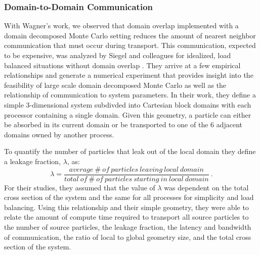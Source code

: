 \subsubsection{Domain-to-Domain Communication}
\label{subsubsec:mc_comm_costs}
With Wagner's work, we observed that domain overlap implemented with a
domain decomposed Monte Carlo setting reduces the amount of nearest
neighbor communication that must occur during transport. This
communication, expected to be expensive, was analyzed by Siegel and
colleagues for idealized, load balanced situations without domain
overlap \citep{siegel_analysis_2012}. They arrive at a few empirical
relationships and generate a numerical experiment that provides
insight into the feasibility of large scale domain decomposed Monte
Carlo as well as the relationship of communication to system
parameters. In their work, they define a simple 3-dimensional system
subdivded into Cartesian block domains with each processor containing
a single domain. Given this geometry, a particle can either be
absorbed in its current domain or be transported to one of the 6
adjacent domains owned by another process.

To quantify the number of particles that leak out of the local domain
they define a leakage fraction, $\lambda$, as:
\begin{equation}
  \lambda =
  \frac{average\ \#\ of\ particles\ leaving\ local\ domain}{total\ 
    of\ \#\ of\ particles\ starting\ in\ local\ domain}\:.
  \label{eq:leakage_fraction}
\end{equation}
For their studies, they assumed that the value of $\lambda$ was
dependent on the total cross section of the system and the same for
all processes for simplicity and load balancing. Using this
relationship and their simple geometry, they were able to relate the
amount of compute time required to transport all source particles to
the number of source particles, the leakage fraction, the latency and
bandwidth of communication, the ratio of local to global geometry
size, and the total cross section of the system.

